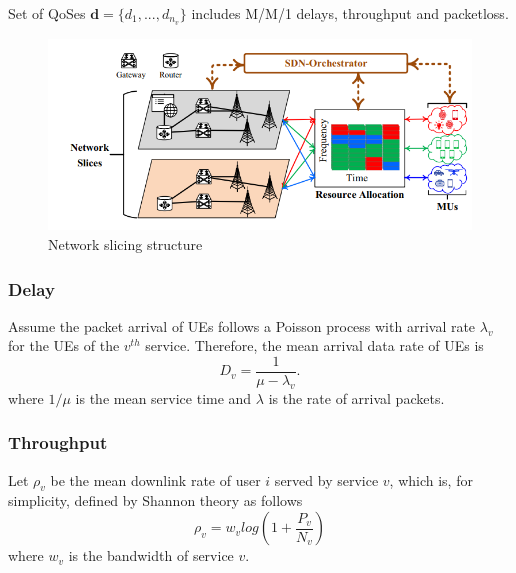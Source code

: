 \documentclass{article}
\begin{document}
Set of QoSes $\mathbf{d} = \{d_1, ..., d_{n_v}\}$ includes M/M/1 delays, throughput and packetloss.
\begin{figure}%
  \centering
    \includegraphics[width=\linewidth]{NS}
  \caption{Network slicing structure \cite{gan}}
  \label{fig:NS}
\end{figure}
\subsubsection{Delay}
Assume the packet arrival of UEs follows a Poisson process with arrival rate $\lambda_v$ for the  UEs of the $v^{th}$ service.
Therefore, the mean arrival data rate of UEs is
\begin{equation}
D_{v} = \frac{1}{\mu - \lambda_v}.
\end{equation}
where $1/\mu$ is the mean service time and $\lambda$ is the rate of arrival packets.
\subsubsection{Throughput}
Let $\rho_v$ be the mean downlink rate of user $i$ served by service $v$, which
is, for simplicity, defined by Shannon theory as follows
\begin{equation}
\rho_v = w_v log(1+\frac{P_v}{N_v}) 
\end{equation}
where $w_v$ is the bandwidth of service $v$.


\end{document}
